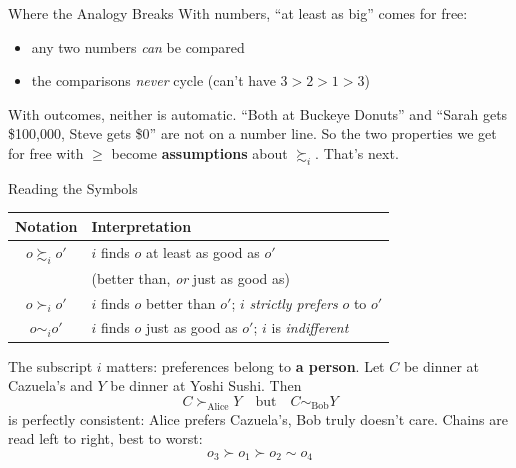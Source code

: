 \begin{frame}{Where the Analogy Breaks}
With numbers, ``at least as big'' comes for free:
\begin{itemize}
    \item any two numbers \textit{can} be compared
    \item the comparisons \textit{never} cycle (can't have $3>2>1>3$)
\end{itemize}
\bsk
With outcomes, neither is automatic. ``Both at Buckeye Donuts'' and
``Sarah gets \$100,000, Steve gets \$0'' are not on a number line.
\vfill
So the two properties we get for free with $\ge$ become
\textbf{assumptions} about $\succsim_i$.
\bsk
That's next.
\vspace{-0.4in}
\end{frame}

\begin{frame}{Reading the Symbols}
\centering
\begin{tabular}{|c|l|}
\hline
\textbf{Notation} & \textbf{Interpretation} \\
\hline
$o\succsim_i o'$ & $i$ finds $o$ at least as good as $o'$ \\
 & (better than, \textit{or} just as good as) \\
\hline
$o\succ_i o'$ & $i$ finds $o$ better than $o'$; $i$ \textit{strictly prefers} $o$ to $o'$ \\
\hline
$o\sim_i o'$ & $i$ finds $o$ just as good as $o'$; $i$ is \textit{indifferent} \\
\hline
\end{tabular}
\bsk
\raggedright
The subscript $i$ matters: preferences belong to \textbf{a person}.
\bsk
Let $C$ be dinner at Cazuela's and $Y$ be dinner at Yoshi Sushi. Then
$$C\succ_{\text{Alice}} Y \quad\text{but}\quad C\sim_{\text{Bob}} Y$$
is perfectly consistent: Alice prefers Cazuela's, Bob truly doesn't care.
\vfill
Chains are read left to right, best to worst:
$$o_3\succ o_1\succ o_2\sim o_4$$
\vspace{-0.4in}
\end{frame}

